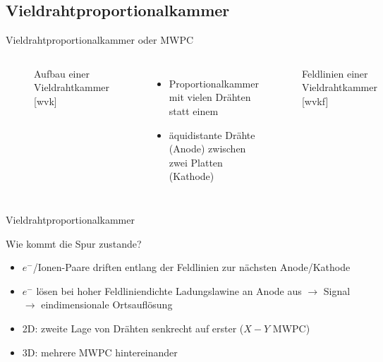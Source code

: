 \subsection[]{Vieldrahtproportionalkammer}


\begin{frame}{Vieldrahtproportionalkammer oder MWPC}
    \begin{columns}[T]
			\begin{figure}[htbp]
			  \centering
			  
			  \caption{Aufbau einer Vieldrahtkammer [wvk]}
			\end{figure}
			
	    	\begin{itemize}
	    	  \item Proportionalkammer mit vielen Drähten statt einem
			  \item äquidistante Drähte (Anode) zwischen zwei Platten (Kathode)
			\end{itemize}
			
			\begin{figure}[htbp]
			  \centering
			  
			  \caption{Feldlinien einer Vieldrahtkammer [wvkf]}
			\end{figure}
    \end{columns}
\end{frame}



\begin{frame}{Vieldrahtproportionalkammer}
    	\begin{block}{Wie kommt die Spur zustande?}
		\begin{itemize}
		  \item $e^-$/Ionen-Paare driften entlang der Feldlinien zur nächsten Anode/Kathode
		  \item $e^-$ lösen bei hoher Feldliniendichte Ladungslawine an Anode aus $\rightarrow$
		  Signal$\rightarrow$ eindimensionale Ortsauflösung
		  \item 2D: zweite Lage von Drähten senkrecht auf erster ($X-Y$ MWPC)
		  \item 3D: mehrere MWPC hintereinander
		\end{itemize}
	\end{block}
\end{frame}

